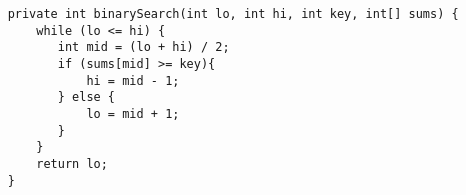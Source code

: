 \begin{description}
\begin{lstlisting}
    private int binarySearch(int lo, int hi, int key, int[] sums) {
        while (lo <= hi) {
           int mid = (lo + hi) / 2;
           if (sums[mid] >= key){
               hi = mid - 1;
           } else {
               lo = mid + 1;
           }
        }
        return lo;
    }
	\end{lstlisting}
\end{description}

